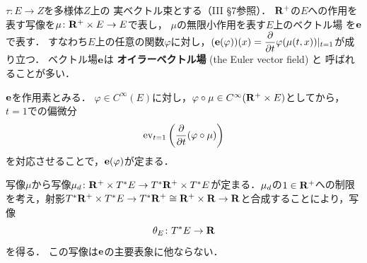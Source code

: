 \(\tau\colon E\to Z\)を多様体\(Z\)上の
実ベクトル束とする（III \S7参照）．
\(\rrp\)の\(E\)への作用を表す写像を\(
    \mu\colon \rrp\times E\to E
\)で表し，
\(\mu\)の無限小作用を表す\(E\)上のベクトル場
を\(\eu\)で表す．
すなわち\(E\)上の任意の関数\(\varphi\)に対し，\(
    (\eu(\varphi))(x)
    =
    \dfrac{\partial}{\partial{t}}\varphi(\mu(t,x))|_{t=1}
\)が成り立つ．
ベクトル場\(\eu\)は
\textbf{オイラーベクトル場} (the Euler vector field) と
呼ばれることが多い．
\begin{CMT*}
    \(\eu\)を作用素とみる．
    \(\varphi\in C^{\infty}(E)\)に対し，\(
        \varphi\circ \mu\in C^{\infty}(\rrp \times E)
    \)としてから，\(t=1\)での偏微分\[
        \ev_{t=1}\left(\frac{\partial}{\partial t}(\varphi\circ \mu)\right)
    \]を対応させることで，\(\eu(\varphi)\)が定まる．
\end{CMT*}
写像\(\mu\)から写像\(
    \mdiff[\mu]\colon
    \rrp\times\cotb[E]\to\cotb[\rrp]\times\cotb[E]
\)が定まる．\(\mdiff[\mu]\)の\(1\in\rrp\)への制限を考え，射影\(
    \cotb[\rrp]\times\cotb[E]
    \to
    \cotb[\rrp]\cong\rrp\times\rr\to\rr
\)と合成することにより，写像\begin{equation}
    \theta_{E}\colon\cotb[E]\to\rr
\end{equation}を得る．
この写像は\(\eu\)の主要表象に他ならない．
